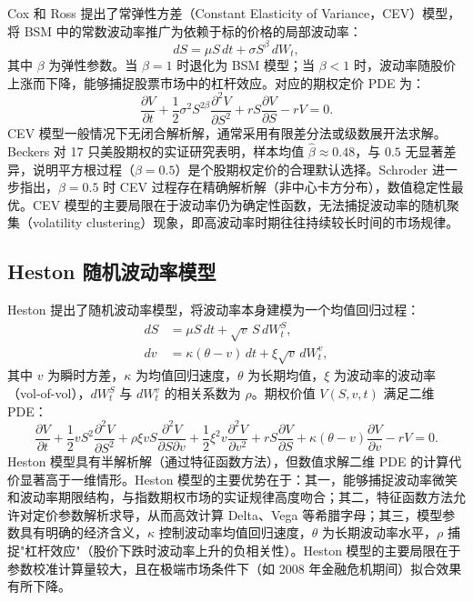 Cox 和 Ross\citep{cox1976valuation} 提出了常弹性方差（Constant Elasticity of Variance，CEV）模型，将 BSM 中的常数波动率推广为依赖于标的价格的局部波动率：
\begin{equation}
  dS = \mu S\,dt + \sigma S^{\beta}\,dW_t,
\end{equation}
其中 $\beta$ 为弹性参数。当 $\beta = 1$ 时退化为 BSM 模型；当 $\beta < 1$ 时，波动率随股价上涨而下降，能够捕捉股票市场中的杠杆效应。对应的期权定价 PDE 为：
\begin{equation}\label{eq:cev}
  \frac{\partial V}{\partial t}
  + \frac{1}{2}\sigma^2 S^{2\beta} \frac{\partial^2 V}{\partial S^2}
  + rS\frac{\partial V}{\partial S}
  - rV = 0.
\end{equation}
CEV 模型一般情况下无闭合解析解，通常采用有限差分法或级数展开法求解。Beckers\citep{beckers1980constant} 对 17 只美股期权的实证研究表明，样本均值 $\hat{\beta} \approx 0.48$，与 $0.5$ 无显著差异，说明平方根过程（$\beta=0.5$）是个股期权定价的合理默认选择。Schroder\citep{schroder1989computing} 进一步指出，$\beta=0.5$ 时 CEV 过程存在精确解析解（非中心卡方分布），数值稳定性最优。CEV 模型的主要局限在于波动率仍为确定性函数，无法捕捉波动率的随机聚集（volatility clustering）现象，即高波动率时期往往持续较长时间的市场规律。

\subsection{Heston 随机波动率模型}

Heston\citep{heston1993closed} 提出了随机波动率模型，将波动率本身建模为一个均值回归过程：
\begin{align}
  dS &= \mu S\,dt + \sqrt{v}\,S\,dW_t^S, \\
  dv &= \kappa(\theta - v)\,dt + \xi\sqrt{v}\,dW_t^v,
\end{align}
其中 $v$ 为瞬时方差，$\kappa$ 为均值回归速度，$\theta$ 为长期均值，$\xi$ 为波动率的波动率（vol-of-vol），$dW_t^S$ 与 $dW_t^v$ 的相关系数为 $\rho$。期权价值 $V(S,v,t)$ 满足二维 PDE：
\begin{equation}\label{eq:heston}
  \frac{\partial V}{\partial t}
  + \frac{1}{2}vS^2\frac{\partial^2 V}{\partial S^2}
  + \rho\xi v S\frac{\partial^2 V}{\partial S\partial v}
  + \frac{1}{2}\xi^2 v\frac{\partial^2 V}{\partial v^2}
  + rS\frac{\partial V}{\partial S}
  + \kappa(\theta-v)\frac{\partial V}{\partial v}
  - rV = 0.
\end{equation}
Heston 模型具有半解析解（通过特征函数方法），但数值求解二维 PDE 的计算代价显著高于一维情形。Heston 模型的主要优势在于：其一，能够捕捉波动率微笑和波动率期限结构，与指数期权市场的实证规律高度吻合；其二，特征函数方法允许对定价参数解析求导，从而高效计算 Delta、Vega 等希腊字母；其三，模型参数具有明确的经济含义，$\kappa$ 控制波动率均值回归速度，$\theta$ 为长期波动率水平，$\rho$ 捕捉"杠杆效应"（股价下跌时波动率上升的负相关性）。Heston 模型的主要局限在于参数校准计算量较大，且在极端市场条件下（如 2008 年金融危机期间）拟合效果有所下降。

